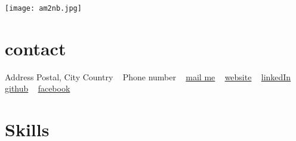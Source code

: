 \documentclass{arturmaciejaszek}
\begin{document}
\pagebreak
{}

\begin{aside}
    \texttt{[image: am2nb.jpg]}
    \section{contact}
    Address
    Postal, City
    Country
    ~
    Phone number
    ~
    \href{mailto:EMAIL ADDRESS}{{\color{main} \faEnvelope} mail me}
    ~
    \href{http://www.arturmaciejaszek.com}{{\color{main}  \faGlobe} website}
    ~
    \href{https://www.linkedin.com/in/arturmaciejaszek/}{{\color{main}  \faLinkedin} linkedIn}
    ~
    \href{https://github.com/arturmaciejaszek}{{\color{main}  \faGithub} github}
    ~
    \href{http://facebook.com/artur.maciejaszek}{{\color{main} \faFacebook} facebook}
\end{aside}

\section{Skills}
\end{document}
